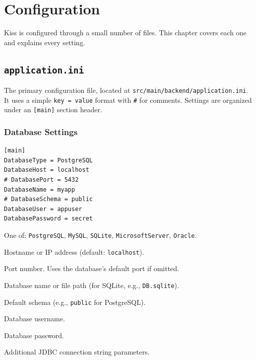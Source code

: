 \chapter{Configuration}
\label{ch:configuration}

Kiss is configured through a small number of files.  This chapter covers each one and explains every setting.

\section{\texttt{application.ini}}
\label{sec:config-appini}

The primary configuration file, located at \texttt{src/main/backend/application.ini}.  It uses a simple \texttt{key = value} format with \texttt{\#} for comments.  Settings are organized under an \texttt{[main]} section header.

\subsection{Database Settings}

\begin{lstlisting}[style=ini]
[main]
DatabaseType = PostgreSQL
DatabaseHost = localhost
# DatabasePort = 5432
DatabaseName = myapp
# DatabaseSchema = public
DatabaseUser = appuser
DatabasePassword = secret
\end{lstlisting}

\begin{description}[style=nextline]
  \item[\texttt{DatabaseType}] One of: \texttt{PostgreSQL}, \texttt{MySQL}, \texttt{SQLite}, \texttt{MicrosoftServer}, \texttt{Oracle}.
  \item[\texttt{DatabaseHost}] Hostname or IP address (default: \texttt{localhost}).
  \item[\texttt{DatabasePort}] Port number.  Uses the database's default port if omitted.
  \item[\texttt{DatabaseName}] Database name or file path (for SQLite, e.g., \texttt{DB.sqlite}).
  \item[\texttt{DatabaseSchema}] Default schema (e.g., \texttt{public} for PostgreSQL).
  \item[\texttt{DatabaseUser}] Database username.
  \item[\texttt{DatabasePassword}] Database password.
  \item[\texttt{DatabaseConnectionParameters}] Additional JDBC connection string parameters.
\end{description}

